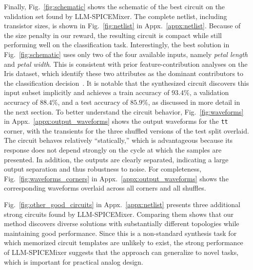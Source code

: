 \documentclass[sigconf,pbalance]{acmart_modified}
\newcommand{\llmspm}{LLM-SPICE\-Mixer}
\begin{document}
Finally, Fig.~\ref{fig:schematic} shows the schematic of the best circuit on the validation set found by \llmspm{}. The complete netlist, including transistor sizes, is shown in Fig.~\ref{fig:netlist} in Appx.~\ref{appx:netlist}. Because of the size penalty in our reward, the resulting circuit is compact while still performing well on the classification task. Interestingly, the best solution in Fig.~\ref{fig:schematic} uses only two of the four available inputs, namely \emph{petal length} and \emph{petal width}. This is consistent with prior feature-contribution analyses on the Iris dataset, which identify these two attributes as the dominant contributors to the classification decision~\cite{palczewska2013interpreting}. It is notable that the synthesized circuit discovers this input subset implicitly and achieves a train accuracy of $93.4\%$, a validation accuracy of $88.4\%$, and a test accuracy of $85.9\%$, as discussed in more detail in the next section. To better understand the circuit behavior, Fig.~\ref{fig:waveforms} in Appx.~\ref{appx:output_waveforms} shows the output waveforms for the \texttt{tt} corner, with the transients for the three shuffled versions of the test split overlaid. The circuit behaves relatively ``statically,'' which is advantageous because its response does not depend strongly on the cycle at which the samples are presented. In addition, the outputs are clearly separated, indicating a large output separation and thus robustness to noise. For completeness, Fig.~\ref{fig:waveforms_corners} in Appx.~\ref{appx:output_waveforms} shows the corresponding waveforms overlaid across all corners and all shuffles.

Fig.~\ref{fig:other_good_circuits} in Appx.~\ref{appx:netlist} presents three additional strong circuits found by \llmspm{}. Comparing them shows that our method discovers diverse solutions with substantially different topologies while maintaining good performance. Since this is a non-standard synthesis task for which memorized circuit templates are unlikely to exist, the strong performance of \llmspm{} suggests that the approach can generalize to novel tasks, which is important for practical analog design.
\end{document}
